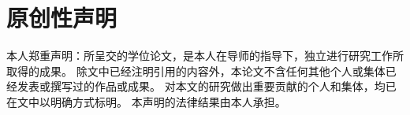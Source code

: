 %
%
%

\thispagestyle{empty}

\mbox{}\vspace{-5em}
\section*{原创性声明}
\vspace{1em}

本人郑重声明：所呈交的学位论文，是本人在导师的指导下，独立进行研究工作所取得的成果。
除文中已经注明引用的内容外，本论文不含任何其他个人或集体已经发表或撰写过的作品或成果。
对本文的研究做出重要贡献的个人和集体，均已在文中以明确方式标明。
本声明的法律结果由本人承担。

\vspace{4em}

